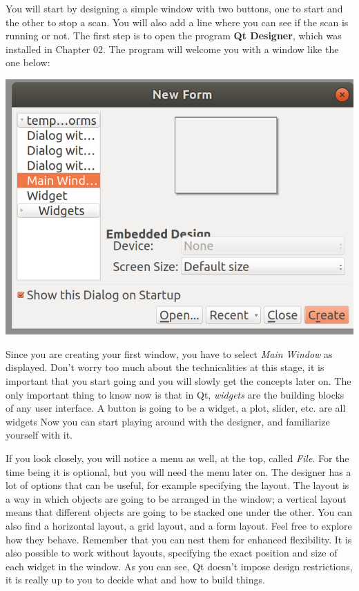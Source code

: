 You will start by designing a simple window with two buttons, one to
start and the other to stop a scan. You will also add a line where you
can see if the scan is running or not. The first step is to open the
program \textbf{Qt Designer}, which was installed in Chapter 02. The
program will welcome you with a window like the one below:

\begin{center}
\includegraphics[width=.6\textwidth]{images/qt_designer_welcome.png}
\end{center}

Since you are creating your first window, you have to select \emph{Main
Window} as displayed. Don't worry too much about the technicalities at
this stage, it is important that you start going and you will slowly get
the concepts later on. The only important thing to know now is that in
Qt, \emph{widgets} are the building blocks of any user interface. A
button is going to be a widget, a plot, slider, etc. are all widgets Now
you can start playing around with the designer, and familiarize yourself
with it.



If you look closely, you will notice a menu as well, at the top, called
\emph{File}. For the time being it is optional, but you will need the
menu later on. The designer has a lot of options that can be useful, for
example specifying the layout. The layout is a way in which objects are
going to be arranged in the window; a vertical layout means that
different objects are going to be stacked one under the other. You can
also find a horizontal layout, a grid layout, and a form layout. Feel
free to explore how they behave. Remember that you can nest them for
enhanced flexibility. It is also possible to work without layouts,
specifying the exact position and size of each widget in the window. As
you can see, Qt doesn't impose design restrictions, it is really up to
you to decide what and how to build things.

